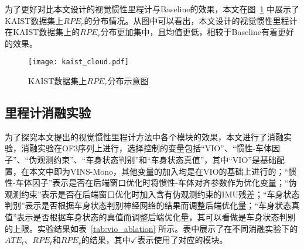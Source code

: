 为了更好对比本文设计的视觉惯性里程计与Baseline的效果，本文在图~\ref{fig:vio_kaist} 中展示了KAIST数据集上$RPE_r$\textdownarrow{}的分布情况。从图中可以看出，本文设计的视觉惯性里程计在KAIST数据集上的$RPE_r$\textdownarrow{}分布更加集中，且均值更低，相较于Baseline有着更好的效果。

\begin{figure}
  \centering
  \texttt{[image: kaist\_cloud.pdf]}
  \caption{KAIST数据集上$RPE_r$\textdownarrow{}分布示意图}
  \label{fig:vio_kaist}
\end{figure}


\subsection{里程计消融实验}
为了探究本文提出的视觉惯性里程计方法中各个模块的效果，本文进行了消融实验，消融实验在OF3序列上进行，选择控制的变量包括“VIO”、“惯性-车体因子”、“伪观测约束”、“车身状态判别”和“车身状态真值”，其中“VIO”是基础配置，在本文中即为VINS-Mono，其他变量的加入均是在VIO的基础上进行的；“惯性-车体因子”表示是否在后端窗口优化时将惯性-车体对齐参数作为优化变量；“伪观测约束”表示是否在后端窗口优化时加入含有伪观测约束的IMU残差；“车身状态判别”表示是否根据车身状态判别神经网络的结果而调整后端优化量；“车身状态真值”表示是否根据车身状态的真值而调整后端优化量，其可以看做是车身状态判别的上限。实验结果如表~\ref{tab:vio_ablation} 所示。表中展示了在不同消融实验下的$ATE_t$、$RPE_t$和$RPE_r$的结果，其中$\checkmark$表示使用了对应的模块。


